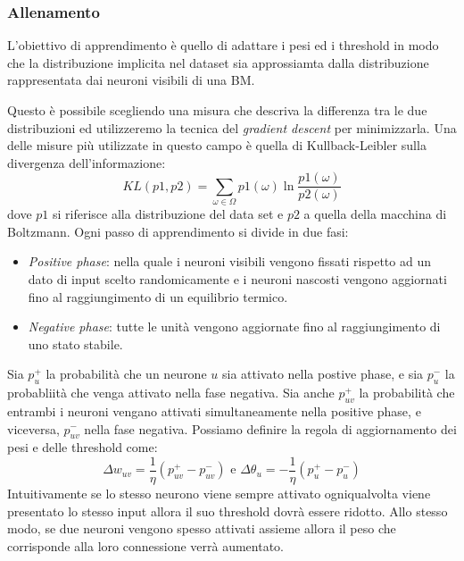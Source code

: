\documentclass{article}
\begin{document}
\subsubsection{Allenamento}
L'obiettivo di apprendimento è quello di adattare i pesi ed i threshold in modo che la
distribuzione implicita nel dataset sia approssiamta dalla distribuzione rappresentata dai
neuroni visibili di una BM.

Questo è possibile scegliendo una misura che descriva la differenza tra le due distribuzioni
ed utilizzeremo la tecnica del \textit{gradient descent} per minimizzarla. Una delle misure più
utilizzate in questo campo è quella di Kullback-Leibler sulla divergenza dell'informazione:
$$KL(p1,p2)= \sum_{\omega\in\Omega}p1(\omega)\ln\frac{p1(\omega)}{p2(\omega)}$$
dove $p1$ si riferisce alla distribuzione del data set e $p2$ a quella della macchina di Boltzmann.
Ogni passo di apprendimento si divide in due fasi:
\begin{itemize}
    \item \textit{Positive phase}: nella quale i neuroni visibili vengono fissati rispetto ad un
          dato di input scelto randomicamente e i neuroni nascosti vengono aggiornati fino
          al raggiungimento di un equilibrio termico.
    \item \textit{Negative phase}: tutte le unità vengono aggiornate fino al raggiungimento di
          uno stato stabile.
\end{itemize}

Sia $p_u^+$ la probabilità che un neurone $u$ sia attivato nella postive phase, e sia $p_u^-$
la probabliità che venga attivato nella fase negativa. Sia anche $p_{uv}^+$ la probabilità
che entrambi i neuroni vengano attivati simultaneamente nella positive phase, e viceversa,
$p_{uv}^-$ nella fase negativa. Possiamo definire la regola di aggiornamento dei pesi
e delle threshold come:
$$\Delta w_{uv}=\frac{1}{\eta}(p_{uv}^+ - p_{uv}^-)\text{ e }\Delta\theta_u =-\frac{1}{\eta}(p_u^+ - p_u^-)$$
Intuitivamente se lo stesso neurono viene sempre attivato ogniqualvolta viene presentato lo stesso
input allora il suo threshold dovrà essere ridotto. Allo stesso modo, se due neuroni vengono
spesso attivati assieme allora il peso che corrisponde alla loro connessione verrà aumentato.
\end{document}
